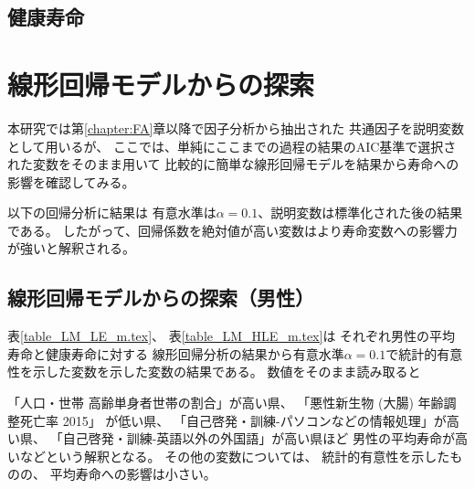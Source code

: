 \documentclass[a4j,11pt,mc]{jreport}
\newcommand{\tb}[1]{\textcolor{blue}{#1}} %
\begin{document}






%
%







\subsection{健康寿命}










%


\section{線形回帰モデルからの探索}

本研究では第\ref{chapter:FA}章以降で因子分析から抽出された
共通因子を説明変数として用いるが、
ここでは、単純にここまでの過程の結果のAIC基準で選択された変数をそのまま用いて
比較的に簡単な線形回帰モデルを結果から寿命への影響を確認してみる。

以下の回帰分析に結果は
有意水準は$\alpha=0.1$、説明変数は標準化された後の結果である。
したがって、回帰係数を絶対値が高い変数はより寿命変数への影響力が強いと解釈される。

\subsection{線形回帰モデルからの探索（男性）}

表\ref{table_LM_LE_m.tex}、
表\ref{table_LM_HLE_m.tex}は
それぞれ男性の平均寿命と健康寿命に対する
線形回帰分析の結果から有意水準$\alpha=0.1$で統計的有意性を示した変数を示した変数の結果である。
数値をそのまま読み取ると

「人口・世帯 高齢単身者世帯の割合」が高い県、
「悪性新生物 (大腸) 年齢調整死亡率 2015」
が低い県、
「自己啓発・訓練-パソコンなどの情報処理」が高い県、
「自己啓発・訓練-英語以外の外国語」が高い県ほど
男性の平均寿命が高いなどという解釈となる。
その他の変数については、
統計的有意性を示したものの、
平均寿命への影響は小さい。
\end{document}
